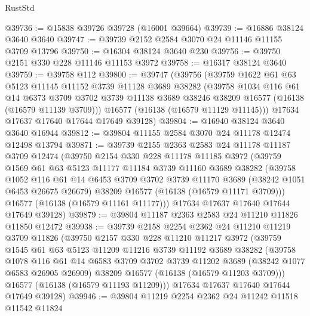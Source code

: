 \begin{lexlean}{RustStd}
\begin{coremodule}
@39736 := @15838 @39726 @39728 (@16001 @39664)
@39739 := @16886 @38124 @3640 @3640
@39747 := @39739 @2152 @2584 @3070 @24 @11146 @11155 @3709 @13796
@39750 := @16304 @38124 @3640 @230
@39756 := @39750 @2151 @330 @228 @11146 @11153 @3972
@39758 := @16317 @38124 @3640
@39759 := @39758 @112
@39800 := @39747
    (@39756
      (@39759
        @1622
        @61
        @63
        @5123
        @11145
        @11152
        @3739
        @11128
        @3689
        @38282
        (@39758
          @1034
          @116
          @61
          @14
          @6373
          @3709
          @3702
          @3739
          @11138
          @3689
          @38246
          @38209
          @16577
          (@16138 (@16579 @11139 @3709)))
        @16577
        (@16138 (@16579 @11129 @11145)))
      @17634
      @17637
      @17640
      @17644
      @17649
      @39128)
@39804 := @16940 @38124 @3640 @3640 @16944
@39812 := @39804 @11155 @2584 @3070 @24 @11178 @12474 @12498 @13794
@39871 := @39739
    @2155
    @2363
    @2583
    @24
    @11178
    @11187
    @3709
    @12474
    (@39750
      @2154
      @330
      @228
      @11178
      @11185
      @3972
      (@39759
        @1569
        @61
        @63
        @5123
        @11177
        @11184
        @3739
        @11160
        @3689
        @38282
        (@39758
          @1052
          @116
          @61
          @14
          @6453
          @3709
          @3702
          @3739
          @11170
          @3689
          (@38242 @1051 @6453 @26675 @26679)
          @38209
          @16577
          (@16138 (@16579 @11171 @3709)))
        @16577
        (@16138 (@16579 @11161 @11177)))
      @17634
      @17637
      @17640
      @17644
      @17649
      @39128)
@39879 := @39804 @11187 @2363 @2583 @24 @11210 @11826 @11850 @12472
@39938 := @39739
    @2158
    @2254
    @2362
    @24
    @11210
    @11219
    @3709
    @11826
    (@39750
      @2157
      @330
      @228
      @11210
      @11217
      @3972
      (@39759
        @1545
        @61
        @63
        @5123
        @11209
        @11216
        @3739
        @11192
        @3689
        @38282
        (@39758
          @1078
          @116
          @61
          @14
          @6583
          @3709
          @3702
          @3739
          @11202
          @3689
          (@38242 @1077 @6583 @26905 @26909)
          @38209
          @16577
          (@16138 (@16579 @11203 @3709)))
        @16577
        (@16138 (@16579 @11193 @11209)))
      @17634
      @17637
      @17640
      @17644
      @17649
      @39128)
@39946 := @39804 @11219 @2254 @2362 @24 @11242 @11518 @11542 @11824

\end{coremodule}
\end{lexlean}
